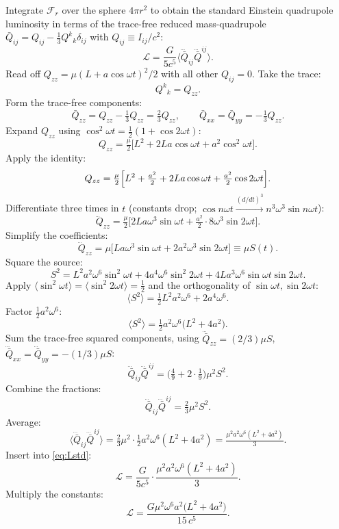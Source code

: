 \documentclass[11pt]{article}
\begin{document}
Integrate $\mathcal F_r$ over the sphere $4\pi r^2$ to obtain the standard Einstein quadrupole luminosity in terms of the trace-free reduced mass-quadrupole $\bar Q_{ij}=Q_{ij}-\tfrac13 Q^k{}_k\delta_{ij}$ with $Q_{ij}\equiv I_{ij}/c^2$:
\begin{equation}
\mathcal L=\frac{G}{5c^5}\bigl\langle\dddot{\bar Q}_{ij}\dddot{\bar Q}^{ij}\bigr\rangle.
\label{eq:Lstd}
\end{equation}
Read off $Q_{zz}=\mu(L+a\cos\omega t)^2/2$ with all other $Q_{ij}=0$. Take the trace:
\[
Q^k{}_k=Q_{zz}.
\]
Form the trace-free components:
\[
\bar Q_{zz}=Q_{zz}-\tfrac13 Q_{zz}=\tfrac23 Q_{zz},\qquad \bar Q_{xx}=\bar Q_{yy}=-\tfrac13 Q_{zz}.
\]
Expand $Q_{zz}$ using $\cos^2\omega t=\tfrac12(1+\cos 2\omega t)$:
\[
Q_{zz}=\tfrac{\mu}{2}\bigl[L^2+2La\cos\omega t+a^2\cos^2\omega t\bigr].
\]
Apply the identity:
\[
Q_{zz}=\tfrac{\mu}{2}\Bigl[L^2+\tfrac{a^2}{2}+2La\cos\omega t+\tfrac{a^2}{2}\cos 2\omega t\Bigr].
\]
Differentiate three times in $t$ (constants drop; $\cos n\omega t\xrightarrow{(d/dt)^3} n^3\omega^3\sin n\omega t$):
\[
\dddot Q_{zz}=\tfrac{\mu}{2}\bigl[2La\omega^3\sin\omega t+\tfrac{a^2}{2}\cdot 8\omega^3\sin 2\omega t\bigr].
\]
Simplify the coefficients:
\[
\dddot Q_{zz}=\mu\bigl[La\omega^3\sin\omega t+2a^2\omega^3\sin 2\omega t\bigr]\equiv\mu S(t).
\]
Square the source:
\[
S^2=L^2a^2\omega^6\sin^2\omega t+4a^4\omega^6\sin^2 2\omega t+4La^3\omega^6\sin\omega t\sin 2\omega t.
\]
Apply $\langle\sin^2\omega t\rangle=\langle\sin^2 2\omega t\rangle=\tfrac12$ and the orthogonality of $\sin\omega t,\sin 2\omega t$:
\[
\langle S^2\rangle=\tfrac12 L^2a^2\omega^6+2a^4\omega^6.
\]
Factor $\tfrac12 a^2\omega^6$:
\[
\langle S^2\rangle=\tfrac12 a^2\omega^6\bigl(L^2+4a^2\bigr).
\]
Sum the trace-free squared components, using $\dddot{\bar Q}_{zz}=(2/3)\mu S$, $\dddot{\bar Q}_{xx}=\dddot{\bar Q}_{yy}=-(1/3)\mu S$:
\[
\dddot{\bar Q}_{ij}\dddot{\bar Q}^{ij}=\bigl(\tfrac{4}{9}+2\cdot\tfrac{1}{9}\bigr)\mu^2 S^2.
\]
Combine the fractions:
\[
\dddot{\bar Q}_{ij}\dddot{\bar Q}^{ij}=\tfrac{2}{3}\mu^2 S^2.
\]
Average:
\[
\langle\dddot{\bar Q}_{ij}\dddot{\bar Q}^{ij}\rangle=\tfrac{2}{3}\mu^2\cdot\tfrac12 a^2\omega^6(L^2+4a^2)=\tfrac{\mu^2 a^2\omega^6(L^2+4a^2)}{3}.
\]
Insert into \eqref{eq:Lstd}:
\[
\mathcal L=\frac{G}{5c^5}\cdot\frac{\mu^2 a^2\omega^6(L^2+4a^2)}{3}.
\]
Multiply the constants:
\begin{equation}
\boxed{\ \mathcal L=\frac{G\mu^2\omega^6 a^2\bigl(L^2+4a^2\bigr)}{15\,c^5}.\ }
\label{eq:Lboxed}
\end{equation}
\end{document}
